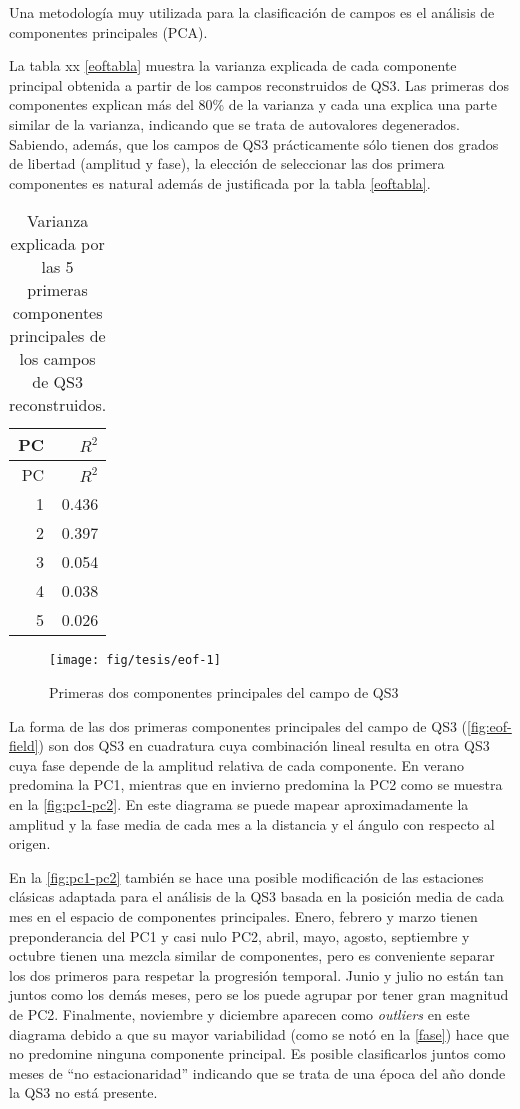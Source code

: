 \documentclass[spanish,a4paper,12p]{book}
\begin{document}
Una metodología muy utilizada para la clasificación de campos es el
análisis de componentes principales
(PCA).

La tabla xx \ref{eoftabla} muestra la
varianza explicada de cada componente principal obtenida a partir de los
campos reconstruidos de QS3. Las primeras dos componentes explican más
del 80\% de la varianza y cada una explica una parte similar de la
varianza, indicando que se trata de autovalores
degenerados. Sabiendo, además, que los campos
de QS3 prácticamente sólo tienen dos grados de libertad (amplitud y
fase), la elección de seleccionar las dos primera componentes es natural
además de justificada por la tabla \ref{eoftabla}.

\begin{longtable}[]{@{}rr@{}}
\caption{Varianza explicada por las 5 primeras componentes principales
de los campos de QS3 reconstruidos.}\tabularnewline
\toprule
PC & \(R^2\)\tabularnewline
\midrule
\endfirsthead
\toprule
PC & \(R^2\)\tabularnewline
\midrule
\endhead
1 & 0.436\tabularnewline
2 & 0.397\tabularnewline
3 & 0.054\tabularnewline
4 & 0.038\tabularnewline
5 & 0.026\tabularnewline
\bottomrule
\end{longtable}

\begin{figure*}
\texttt{[image: fig/tesis/eof-1]} \caption{Primeras dos componentes principales del campo de QS3}\label{fig:eof}
\end{figure*}

La forma de las dos primeras componentes principales del campo de QS3
(\autoref{fig:eof-field}) son dos QS3 en cuadratura cuya combinación
lineal resulta en otra QS3 cuya fase depende de la amplitud relativa de
cada componente. En verano predomina la PC1, mientras que en invierno
predomina la PC2 como se muestra en la \autoref{fig:pc1-pc2}. En este
diagrama se puede mapear aproximadamente la amplitud y la fase media de
cada mes a la distancia y el ángulo con respecto al origen.

En la \autoref{fig:pc1-pc2} también se hace una posible modificación de
las estaciones clásicas adaptada para el análisis de la QS3 basada en la
posición media de cada mes en el espacio de componentes principales.
Enero, febrero y marzo tienen preponderancia del PC1 y casi nulo PC2,
abril, mayo, agosto, septiembre y octubre tienen una mezcla similar de
componentes, pero es conveniente separar los dos primeros para respetar
la progresión temporal. Junio y julio no están tan juntos como los demás
meses, pero se los puede agrupar por tener gran magnitud de PC2.
Finalmente, noviembre y diciembre aparecen como \emph{outliers} en este
diagrama debido a que su mayor variabilidad (como se notó en la
\autoref{fase}) hace que no predomine ninguna componente principal. Es
posible clasificarlos juntos como meses de ``no estacionaridad''
indicando que se trata de una época del año donde la QS3 no está
presente.
\end{document}
